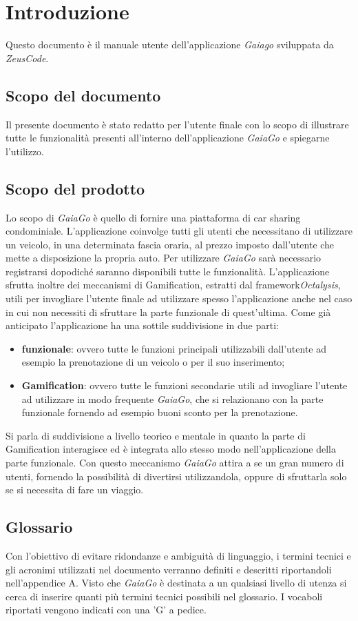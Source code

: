 \section{Introduzione}
Questo documento è il manuale utente dell'applicazione \textit{Gaiago} sviluppata da \textit{ZeusCode}.
\subsection{Scopo del documento}
Il presente documento è stato redatto per l’utente finale con lo scopo di illustrare tutte le funzionalità presenti all'interno dell'applicazione \textit{GaiaGo} e spiegarne l’utilizzo.

\subsection{Scopo del prodotto}
Lo scopo di \textit{GaiaGo} è quello di fornire una piattaforma di car sharing condominiale. L'applicazione coinvolge tutti gli utenti che necessitano di utilizzare un veicolo, in una determinata fascia oraria, al prezzo imposto dall'utente che mette a disposizione la propria auto. Per utilizzare \textit{GaiaGo} sarà necessario registrarsi dopodiché saranno disponibili tutte le funzionalità. L'applicazione sfrutta inoltre dei meccanismi di Gamification\glo, estratti dal framework\glosp \textit{Octalysis}\glo, utili per invogliare l'utente finale ad utilizzare spesso l'applicazione anche nel caso in cui non necessiti di sfruttare la parte funzionale di quest'ultima. Come già anticipato l'applicazione ha una sottile suddivisione in due parti:
\begin{itemize}
	\item \textbf{funzionale}: ovvero tutte le funzioni principali utilizzabili dall'utente ad esempio la prenotazione di un veicolo o per il suo inserimento; 
	\item \textbf{Gamification}: ovvero tutte le funzioni secondarie utili ad invogliare l'utente ad utilizzare in modo frequente \textit{GaiaGo}, che si relazionano con la parte funzionale fornendo ad esempio buoni sconto per la prenotazione.
\end{itemize}
 Si parla di suddivisione a livello teorico e mentale in quanto la parte di Gamification interagisce ed è integrata allo stesso modo nell'applicazione della parte funzionale.
 Con questo meccanismo \textit{GaiaGo} attira a se un gran numero di utenti, fornendo la possibilità di divertirsi utilizzandola, oppure di sfruttarla solo se si necessita di fare un viaggio.
\subsection{Glossario}
Con l'obiettivo di evitare ridondanze e ambiguità di linguaggio, i termini tecnici e gli acronimi
utilizzati nel documento verranno definiti e descritti riportandoli nell'appendice A.
Visto che \textit{GaiaGo} è destinata a un qualsiasi livello di utenza si cerca di inserire quanti più termini tecnici possibili nel glossario.
I vocaboli riportati vengono indicati con una 'G' a pedice.